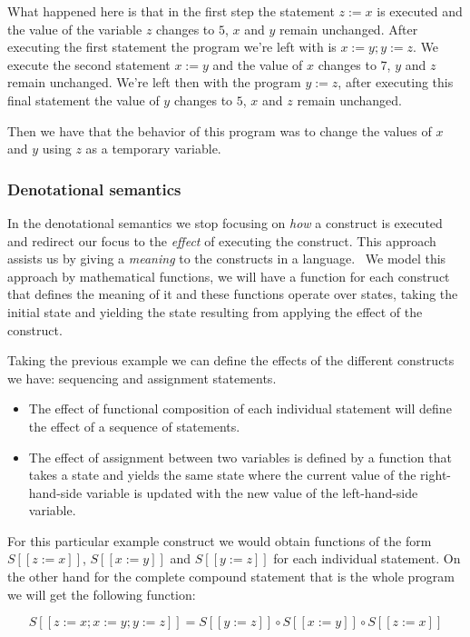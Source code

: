 What happened here is that in the first step the statement $z:=x$ is executed and the value of the variable $z$ changes to $5$, $x$ and $y$ remain unchanged.
After executing the first statement the program we're left with is $x:=y; y:=z$.
We execute the second statement $x:=y$ and the value of $x$ changes to $7$, $y$ and $z$ remain unchanged.
We're left then with the program $y:=z$, after executing this final statement the value of $y$ changes to $5$, $x$ and $z$ remain unchanged.

Then we have that the behavior of this program was to change the values of $x$ and $y$ using $z$ as a temporary variable.


\subsubsection{Denotational semantics}
In the denotational semantics we stop focusing on \textit{how} a construct is executed and redirect our focus to the \textit{effect} of executing the construct.
This approach assists us by giving a \textit{meaning} to the constructs in a language.~\parencite{nipkow}
We model this approach by mathematical functions, we will have a function for each construct that defines the meaning of it and these functions operate over states, taking the initial state and yielding the state resulting from applying the effect of the construct.

Taking the previous example we can define the effects of the different constructs we have: sequencing and assignment statements.

\begin{itemize}
\item{The effect of functional composition of each individual statement will define the effect of a sequence of statements.}
\item{The effect of assignment between two variables is defined by a function that takes a state and yields the same state where the current value of the right-hand-side variable is updated with the new value of the left-hand-side variable.}
\end{itemize}

For this particular example construct we would obtain functions of the form $S [\![ z:=x ]\!]$, $S [\![ x:=y ]\!]$ and $S [\![ y:=z ]\!]$ for each individual statement.
On the other hand for the complete compound statement that is the whole program we will get the following function:

\begin{equation*}
S [\![ z:=x; x:=y; y:=z ]\!] = S [\![ y:=z ]\!] \circ S [\![ x:=y ]\!] \circ S [\![ z:=x ]\!]
\end{equation*}

